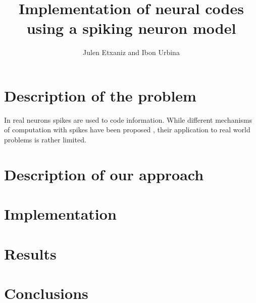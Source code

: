 \documentclass{article} %
\title{Implementation of neural codes using a spiking
neuron model}
\author{Julen Etxaniz and Ibon Urbina}
\begin{document}
\maketitle

\begin{abstract}

\end{abstract}

\tableofcontents
\newpage

\section{Description of the problem}
In real neurons spikes are used to code information. While different mechanisms of computation with spikes have been proposed \cite{paugammoisy:hal-01587781} \cite{PMID:22237491}, their application to real world problems is rather limited.


\section{Description of our approach}
 
\section{Implementation}

\section{Results}

\section{Conclusions}



\end{document}

